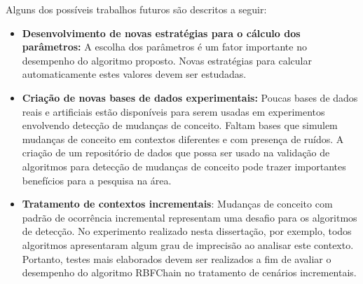 \documentclass[msc, classic, a4paper]{ufbathesis}
\begin{document}
Alguns dos possíveis trabalhos futuros são descritos a seguir:

\begin{itemize}

    \item \textbf{Desenvolvimento de novas estratégias para o cálculo dos parâmetros:} A escolha dos
parâmetros é um fator importante no desempenho do
algoritmo proposto. Novas estratégias para calcular automaticamente estes valores devem ser estudadas.

    \item \textbf{Criação de novas bases de dados experimentais:} Poucas bases de dados reais
e artificiais estão disponíveis para serem usadas em experimentos envolvendo detecção de mudanças de conceito.
Faltam bases que simulem mudanças de conceito em contextos diferentes e com presença de ruídos. 
A criação de um repositório de dados que possa ser usado na validação de algoritmos para detecção de mudanças de conceito pode trazer importantes benefícios para a pesquisa na área.

\item \textbf{Tratamento de contextos incrementais}: Mudanças de conceito com padrão de ocorrência incremental representam uma desafio para os algoritmos de detecção.
No experimento realizado nesta dissertação, por exemplo, todos algoritmos apresentaram algum grau de imprecisão ao analisar este contexto.
Portanto, testes mais elaborados devem ser realizados a fim de avaliar o desempenho do algoritmo RBFChain no tratamento de cenários incrementais.

\end{itemize}

\backmatter





%
% 
% 

\end{document}
